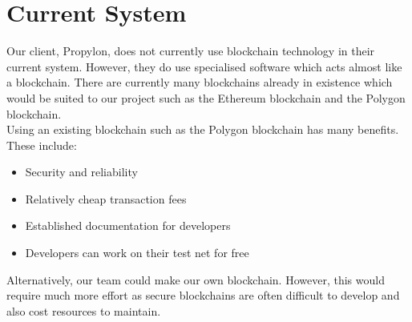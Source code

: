 \section{Current System}
Our client, Propylon, does not currently use blockchain technology in their current system.
However, they do use specialised software which acts almost like a blockchain. 
There are currently many blockchains already in existence which would be suited to our project 
such as the Ethereum blockchain and the Polygon blockchain. \\

\noindent
Using an existing blockchain such as the Polygon blockchain has many benefits. These include: 

\begin{itemize}
    \item Security and reliability
    \item Relatively cheap transaction fees 
    \item Established documentation for developers
    \item Developers can work on their test net for free 
\end{itemize}

\noindent
Alternatively, our team could make our own blockchain. 
However, this would require much more effort as secure blockchains 
are often difficult to develop and also cost resources to maintain. 
